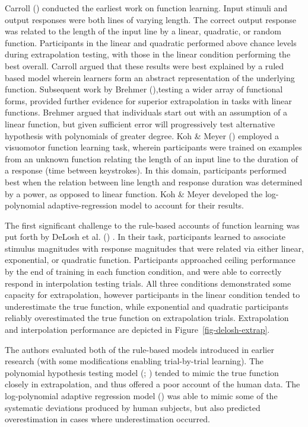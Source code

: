 \documentclass[
  letterpaper,
  DIV=11,
  numbers=noendperiod,
  oneside]{scrartcl}
\begin{document}
Carroll ()
conducted the earliest work on function learning. Input stimuli and
output responses were both lines of varying length. The correct output
response was related to the length of the input line by a linear,
quadratic, or random function. Participants in the linear and quadratic
performed above chance levels during extrapolation testing, with those
in the linear condition performing the best overall. Carroll argued that
these results were best explained by a ruled based model wherein
learners form an abstract representation of the underlying function.
Subsequent work by Brehmer
(),testing a
wider array of functional forms, provided further evidence for superior
extrapolation in tasks with linear functions. Brehmer argued that
individuals start out with an assumption of a linear function, but given
sufficient error will progressively test alternative hypothesis with
polynomials of greater degree. Koh \& Meyer
() employed a
visuomotor function learning task, wherein participants were trained on
examples from an unknown function relating the length of an input line
to the duration of a response (time between keystrokes). In this domain,
participants performed best when the relation between line length and
response duration was determined by a power, as opposed to linear
function. Koh \& Meyer developed the log-polynomial adaptive-regression
model to account for their results.

The first significant challenge to the rule-based accounts of function
learning was put forth by DeLosh et al.
() . In their task,
participants learned to associate stimulus magnitudes with response
magnitudes that were related via either linear, exponential, or
quadratic function. Participants approached ceiling performance by the
end of training in each function condition, and were able to correctly
respond in interpolation testing trials. All three conditions
demonstrated some capacity for extrapolation, however participants in
the linear condition tended to underestimate the true function, while
exponential and quadratic participants reliably overestimated the true
function on extrapolation trials. Extrapolation and interpolation
performance are depicted in Figure~\ref{fig-delosh-extrap}.

The authors evaluated both of the rule-based models introduced in
earlier research (with some modifications enabling trial-by-trial
learning). The polynomial hypothesis testing model
(;
)
tended to mimic the true function closely in extrapolation, and thus
offered a poor account of the human data. The log-polynomial adaptive
regression model () was able to mimic some of the systematic deviations
produced by human subjects, but also predicted overestimation in cases
where underestimation occurred.
\end{document}
